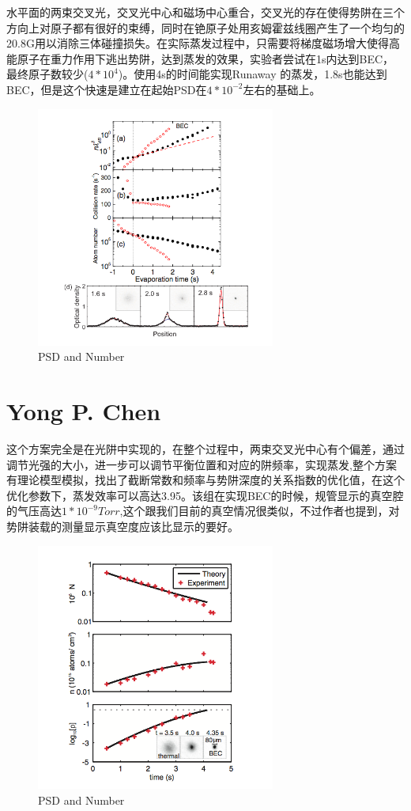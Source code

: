 \documentclass[onecolumn,a4paper,10pt]{article}
\begin{document}
水平面的两束交叉光，交叉光中心和磁场中心重合，交叉光的存在使得势阱在三个方向上对原子都有很好的束缚，同时在铯原子处用亥姆霍兹线圈产生了一个均匀的20.8G用以消除三体碰撞损失。在实际蒸发过程中，只需要将梯度磁场增大使得高能原子在重力作用下逃出势阱，达到蒸发的效果，实验者尝试在1s内达到BEC，最终原子数较少($4*10^4$)。使用4s的时间能实现Runaway 的蒸发，1.8s也能达到BEC，但是这个快速是建立在起始PSD在$4*10^{-2}$左右的基础上。
\begin{figure}[H]
\centering
\includegraphics[width=0.7\textwidth]{ChengChin}
\caption{PSD and Number}
\label{fig2:ChengChin}
\end{figure}

\section{Yong P. Chen\cite{mc3}}
这个方案完全是在光阱中实现的，在整个过程中，两束交叉光中心有个偏差，通过调节光强的大小，进一步可以调节平衡位置和对应的阱频率，实现蒸发,整个方案有理论模型模拟，找出了截断常数和频率与势阱深度的关系指数的优化值，在这个优化参数下，蒸发效率可以高达3.95。该组在实现BEC的时候，规管显示的真空腔的气压高达$1*10^{-9}  Torr$,这个跟我们目前的真空情况很类似，不过作者也提到，对势阱装载的测量显示真空度应该比显示的要好。
\begin{figure}[H]
\centering
\includegraphics[width=0.7\textwidth]{ChenP}
\caption{PSD and Number}
\label{fig3:ChenP}
\end{figure}
\end{document}
